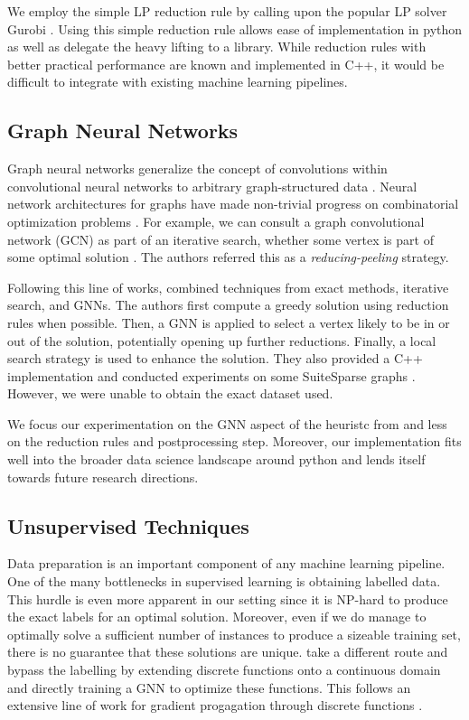 \documentclass{article}
\begin{document}
We employ the simple LP reduction rule by calling upon the popular LP solver Gurobi \citet{gurobi}.
Using this simple reduction rule allows ease of implementation in python
as well as delegate the heavy lifting to a library.
While reduction rules with better practical performance are known and implemented in C++,
it would be difficult to integrate with existing machine learning pipelines.

\subsection{Graph Neural Networks}
Graph neural networks generalize the concept of convolutions
within convolutional neural networks
to arbitrary graph-structured data \citet{scarselli2008graph}.
Neural network architectures for graphs have made non-trivial progress on combinatorial optimization problems \citet{cappart2021combinatorial}.
For example, we can consult a graph convolutional network (GCN) as part of an iterative search,
whether some vertex is part of some optimal solution \citet{comboptgcn}.
The authors referred this as a \emph{reducing-peeling} strategy.

Following this line of works,
\citet{langedal_et_al} combined techniques from exact methods,
iterative search,
and GNNs.
The authors first compute a greedy solution using reduction rules when possible.
Then, a GNN is applied to select a vertex likely to be in or out of the solution,
potentially opening up further reductions.
Finally, a local search strategy is used to enhance the solution.
They also provided a C++ implementation
and conducted experiments on some SuiteSparse graphs \citet{suitesparse}.
However, we were unable to obtain the exact dataset used.

We focus our experimentation on the GNN aspect of the heuristc from \citet{langedal_et_al}
and less on the reduction rules and postprocessing step.
Moreover, our implementation fits well into the broader data science landscape around python
and lends itself towards future research directions.

\subsection{Unsupervised Techniques}
Data preparation is an important component of any machine learning pipeline.
One of the many bottlenecks in supervised learning is obtaining labelled data.
This hurdle is even more apparent in our setting
since it is NP-hard to produce the exact labels for an optimal solution.
Moreover, even if we do manage to optimally solve a sufficient number of instances
to produce a sizeable training set,
there is no guarantee that these solutions are unique.
\citet{karalias2022neural} take a different route
and bypass the labelling by extending discrete functions onto a continuous domain
and directly training a GNN to optimize these functions.
This follows an extensive line of work for gradient progagation
through discrete functions \citet{williams1992simple,bengio2013estimating,karalias2020erdos}.
\end{document}
